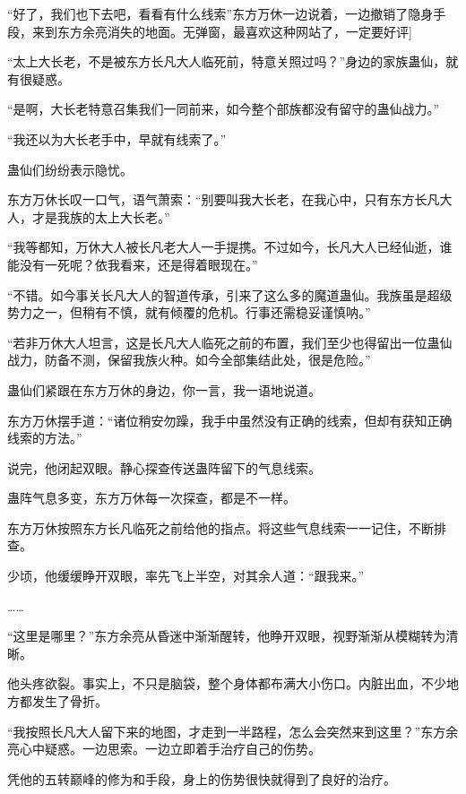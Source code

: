 
\begin{this_body}

“好了，我们也下去吧，看看有什么线索”东方万休一边说着，一边撤销了隐身手段，来到东方余亮消失的地面。无弹窗，最喜欢这种网站了，一定要好评]

“太上大长老，不是被东方长凡大人临死前，特意关照过吗？”身边的家族蛊仙，就有很疑惑。

“是啊，大长老特意召集我们一同前来，如今整个部族都没有留守的蛊仙战力。”

“我还以为大长老手中，早就有线索了。”

蛊仙们纷纷表示隐忧。

东方万休长叹一口气，语气萧索：“别要叫我大长老，在我心中，只有东方长凡大人，才是我族的太上大长老。”

“我等都知，万休大人被长凡老大人一手提携。不过如今，长凡大人已经仙逝，谁能没有一死呢？依我看来，还是得着眼现在。”

“不错。如今事关长凡大人的智道传承，引来了这么多的魔道蛊仙。我族虽是超级势力之一，但稍有不慎，就有倾覆的危机。行事还需稳妥谨慎呐。”

“若非万休大人坦言，这是长凡大人临死之前的布置，我们至少也得留出一位蛊仙战力，防备不测，保留我族火种。如今全部集结此处，很是危险。”

蛊仙们紧跟在东方万休的身边，你一言，我一语地说道。

东方万休摆手道：“诸位稍安勿躁，我手中虽然没有正确的线索，但却有获知正确线索的方法。”

说完，他闭起双眼。静心探查传送蛊阵留下的气息线索。

蛊阵气息多变，东方万休每一次探查，都是不一样。

东方万休按照东方长凡临死之前给他的指点。将这些气息线索一一记住，不断排查。

少顷，他缓缓睁开双眼，率先飞上半空，对其余人道：“跟我来。”

……

“这里是哪里？”东方余亮从昏迷中渐渐醒转，他睁开双眼，视野渐渐从模糊转为清晰。

他头疼欲裂。事实上，不只是脑袋，整个身体都布满大小伤口。内脏出血，不少地方都发生了骨折。

“我按照长凡大人留下来的地图，才走到一半路程，怎么会突然来到这里？”东方余亮心中疑惑。一边思索。一边立即着手治疗自己的伤势。

凭他的五转巅峰的修为和手段，身上的伤势很快就得到了良好的治疗。


\end{this_body}
